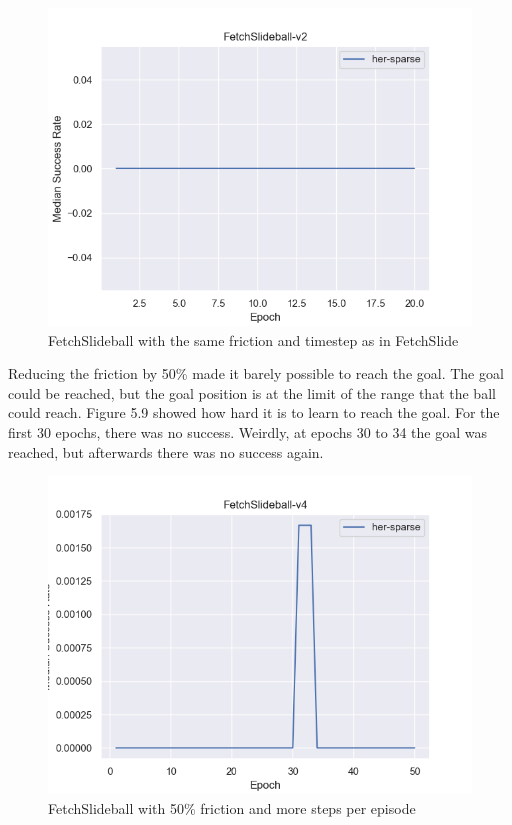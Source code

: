  
\begin{figure} [h]
	
	\centering
	\includegraphics[width=1\textwidth]{figures/fig_FetchSlideball-v2.png}
	\caption{FetchSlideball with the same friction and timestep as in FetchSlide}
	
\end{figure}


Reducing the friction by 50\% made it barely possible to reach the goal. The goal could be reached, but the goal position is at the limit of the range that the ball could reach. Figure 5.9 showed how hard it is to learn to reach the goal. For the first 30 epochs, there was no success. Weirdly, at epochs 30 to 34 the goal was reached, but afterwards there was no success again. 



\begin{figure} [h]
	
	\centering
	\includegraphics[width=1\textwidth]{figures/fig_FetchSlideball-v4.png}
	\caption{FetchSlideball with 50\% friction and more steps per episode}
	
\end{figure}

